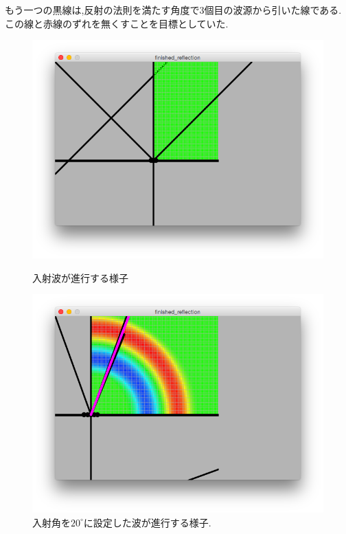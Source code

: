 もう一つの黒線は,反射の法則を満たす角度で3個目の波源から引いた線である.この線と赤線のずれを無くすことを目標としていた.
\begin{figure}[H]
\begin{minipage}{0.5\hsize}
\begin{center}
\includegraphics[width=\linewidth]
  {../result/reflectionincident.png}
\caption{入射波が進行する様子}
\label{fig:reflectionincident}
\end{center}
\end{minipage}%
\begin{minipage}{0.5\hsize}
\begin{center}
\includegraphics[width=\linewidth]
  {../result/reflectionangle20.png}
\caption{入射角を$20^{\circ}$に設定した波が進行する様子.}
\label{fig:reflection20}
\end{center}
\end{minipage}
\end{figure}

